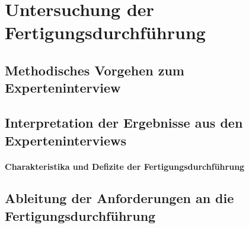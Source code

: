 \section{Untersuchung der Fertigungsdurchführung}

\subsection{Methodisches Vorgehen zum Experteninterview}

\subsection{Interpretation der Ergebnisse aus den Experteninterviews}
\paragraph{Charakteristika und Defizite der Fertigungsdurchführung}

\subsection{Ableitung der Anforderungen an die Fertigungsdurchführung}